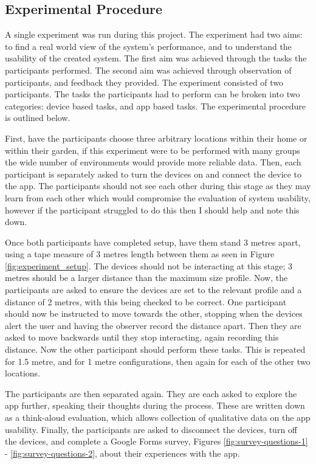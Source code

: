 \documentclass{l4proj}
\begin{document}
\subsection{Experimental Procedure}

A single experiment was run during this project. The experiment had two aims: to find a real world view of the system's performance, and to understand the usability of the created system. The first aim was achieved through the tasks the participants performed. The second aim was achieved through observation of participants, and feedback they provided. The experiment consisted of two participants. The tasks the participants had to perform can be broken into two categories: device based tasks, and app based tasks. The experimental procedure is outlined below.

First, have the participants choose three arbitrary locations within their home or within their garden, if this experiment were to be performed with many groups the wide number of environments would provide more reliable data. Then, each participant is separately asked to turn the devices on and connect the device to the app. The participants should not see each other during this stage as they may learn from each other which would compromise the evaluation of system usability, however if the participant struggled to do this then I should help and note this down.

Once both participants have completed setup, have them stand 3 metres apart, using a tape measure of 3 metres length between them as seen in Figure \ref{fig:experiment_setup}. The devices should not be interacting at this stage; 3 metres should be a larger distance than the maximum size profile. Now, the participants are asked to ensure the devices are set to the relevant profile and a distance of 2 metres, with this being checked to be correct. One participant should now be instructed to move towards the other, stopping when the devices alert the user and having the observer record the distance apart. Then they are asked to move backwards until they stop interacting, again recording this distance. Now the other participant should perform these tasks. This is repeated for 1.5 metre, and for 1 metre configurations, then again for each of the other two locations.

The participants are then separated again. They are each asked to explore the app further, speaking their thoughts during the process. These are written down as a think-aloud evaluation, which allows collection of qualitative data on the app usability. Finally, the participants are asked to disconnect the devices, turn off the devices, and complete a Google Forms survey, Figures \ref{fig:survey-questions-1} - \ref{fig:survey-questions-2}, about their experiences with the app.
\end{document}
